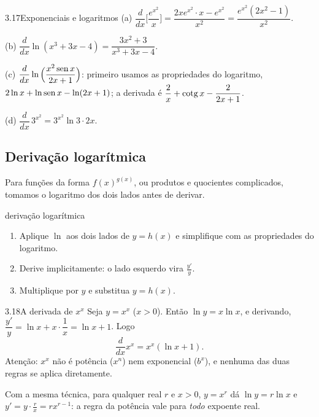 \begin{exemplo}{3.17}{Exponenciais e logaritmos}
(a) $\dfrac{d}{dx}\Big[\dfrac{e^{x^2}}{x}\Big]=\dfrac{2xe^{x^2}\cdot x-e^{x^2}}{x^2}
=\dfrac{e^{x^2}(2x^2-1)}{x^2}$.

(b) $\dfrac{d}{dx}\ln(x^3+3x-4)=\dfrac{3x^2+3}{x^3+3x-4}$.

(c) $\dfrac{d}{dx}\ln\Big(\dfrac{x^2\operatorname{sen} x}{2x+1}\Big)$: primeiro usamos as propriedades do
logaritmo, $2\ln x+\ln\operatorname{sen} x-\ln(2x+1)$; a derivada é $\dfrac2x+\operatorname{cotg} x-\dfrac{2}{2x+1}$.

(d) $\dfrac{d}{dx}\,3^{x^2}=3^{x^2}\ln3\cdot2x$.
\end{exemplo}

\subsection{Derivação logarítmica}

Para funções da forma $f(x)^{g(x)}$, ou produtos e quocientes complicados, tomamos o
logaritmo dos dois lados antes de derivar.

\begin{estrategia}{derivação logarítmica}
\begin{enumerate}[label=\arabic*.]
\item Aplique $\ln$ aos dois lados de $y=h(x)$ e simplifique com as propriedades do
  logaritmo.
\item Derive implicitamente: o lado esquerdo vira $\frac{y'}{y}$.
\item Multiplique por $y$ e substitua $y=h(x)$.
\end{enumerate}
\end{estrategia}

\begin{exemplo}{3.18}{A derivada de $x^x$}
Seja $y=x^x$ ($x>0$). Então $\ln y=x\ln x$, e derivando,
$\dfrac{y'}{y}=\ln x+x\cdot\dfrac1x=\ln x+1$. Logo
\[
\frac{d}{dx}x^x=x^x(\ln x+1).
\]
Atenção: $x^x$ não é potência ($x^n$) nem exponencial ($b^x$), e nenhuma das duas regras
se aplica diretamente.
\end{exemplo}

Com a mesma técnica, para qualquer real $r$ e $x>0$, $y=x^r$ dá $\ln y=r\ln x$ e
$y'=y\cdot\frac rx=rx^{r-1}$: a regra da potência vale para \emph{todo} expoente real.

